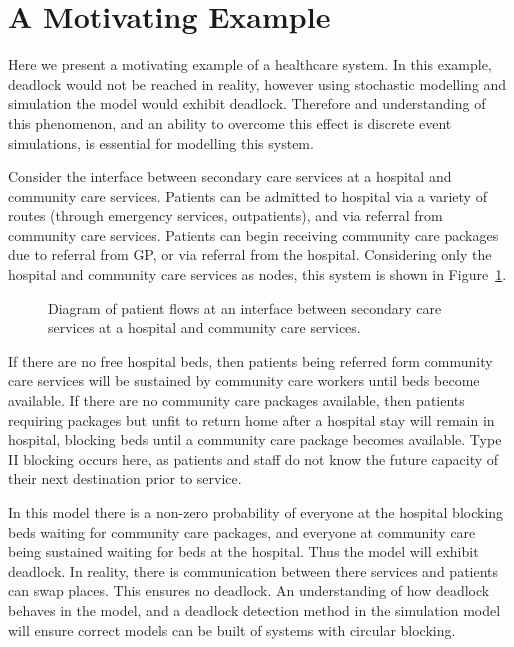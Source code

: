 \documentclass{article}
\numberwithin{equation}{section}
\begin{document}
\section{A Motivating Example}\label{sec:motivatingexample}

Here we present a motivating example of a healthcare system.
In this example, deadlock would not be reached in reality, however using stochastic modelling and simulation the model would exhibit deadlock.
Therefore and understanding of this phenomenon, and an ability to overcome this effect is discrete event simulations, is essential for modelling this system.

Consider the interface between secondary care services at a hospital and community care services.
Patients can be admitted to hospital via a variety of routes (through emergency services, outpatients), and via referral from community care services.
Patients can begin receiving community care packages due to referral from GP, or via referral from the hospital.
Considering only the hospital and community care services as nodes, this system is shown in Figure~\ref{fig:motivatingexample}.

\begin{figure}
\begin{center}

\end{center}
\caption{Diagram of patient flows at an interface between secondary care services at a hospital and community care services.}
\label{fig:motivatingexample}
\end{figure}

If there are no free hospital beds, then patients being referred form community care services will be sustained by community care workers until beds become available.
If there are no community care packages available, then patients requiring packages but unfit to return home after a hospital stay will remain in hospital, blocking beds until a community care package becomes available.
Type II blocking occurs here, as patients and staff do not know the future capacity of their next destination prior to service.

In this model there is a non-zero probability of everyone at the hospital blocking beds waiting for community care packages, and everyone at community care being sustained waiting for beds at the hospital.
Thus the model will exhibit deadlock.
In reality, there is communication between there services and patients can swap places.
This ensures no deadlock.
An understanding of how deadlock behaves in the model, and a deadlock detection method in the simulation model will ensure correct models can be built of systems with circular blocking.
\end{document}
